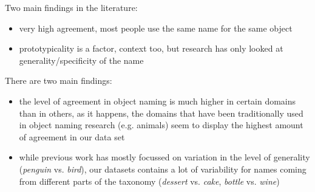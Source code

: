 Two main findings in the literature:

\begin{itemize}
\item very high agreement, most people use the same name for the same object
\item prototypicality is a factor, context too, but research has only looked at generality/specificity of the name
\end{itemize}



There are two main findings:

\begin{itemize}
\item the level of agreement in object naming is much higher in certain domains than in others, as it happens, the domains that have been traditionally used in object naming research (e.g. animals) seem to display the highest amount of agreement in our data set 
\item while previous work has mostly focussed on variation in the level of generality (\emph{penguin} vs. \emph{bird}), our datasets contains a lot of variability for names coming from different parts of the taxonomy (\emph{dessert} vs. \emph{cake}, \emph{bottle} vs. \emph{wine})
\end{itemize}






